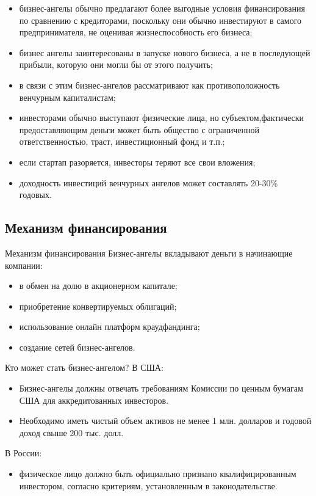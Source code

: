 \documentclass[_Venture_p2.tex]{subfiles}
\begin{document}
\begin{frame}[allowframebreaks]{}{}
\begin{itemize}
	\item бизнес-ангелы обычно предлагают более выгодные условия финансирования по сравнению с кредиторами, поскольку они обычно инвестируют в самого предпринимателя, не оценивая жизнеспособность его бизнеса;
	
	\pagebreak
	\item бизнес ангелы заинтересованы в запуске нового бизнеса, а не в последующей прибыли, которую они могли бы от этого получить;
	\item в связи с этим бизнес-ангелов рассматривают как противоположность венчурным капиталистам;
	
	\pagebreak
	\item инвесторами обычно выступают физические лица, но субъектом,фактически предоставляющим деньги может быть общество с ограниченной ответственностью, траст, инвестиционный фонд и т.п.;
	\item если стартап разоряется, инвесторы теряют все свои вложения;
	\item доходность инвестиций венчурных ангелов может составлять 20-30\% годовых.
\end{itemize}
\end{frame}

\subsection{Механизм финансирования}
\begin{frame}[allowframebreaks]{Механизм финансирования}{}
Бизнес-ангелы вкладывают деньги в начинающие компании: 
\begin{itemize}
	\item в обмен на долю в акционерном капитале;
	\item приобретение конвертируемых облигаций;
	\item использование онлайн платформ краудфандинга;
	\item создание сетей бизнес-ангелов.
\end{itemize}
\end{frame}


\begin{frame}[allowframebreaks]{Кто может стать бизнес-ангелом?}
В США:
\begin{itemize}
	\item Бизнес-ангелы  должны отвечать требованиям Комиссии по ценным бумагам США для аккредитованных инвесторов.
	\item Необходимо иметь чистый объем активов не менее 1 млн. долларов и годовой доход свыше 200 тыс. долл.
\end{itemize}

\pagebreak
В России:
\begin{itemize}
	\item физическое лицо должно быть официально признано квалифицированным инвестором, согласно критериям, установленным в законодательстве.
\end{itemize}
\end{frame}
\end{document}
